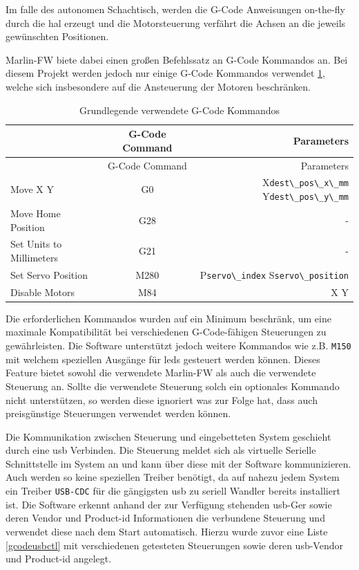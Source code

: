 Im falle des autonomen Schachtisch, werden die G-Code Anweisungen
on-the-fly durch die \gls{hal} erzeugt und die Motorsteuerung verfährt
die Achsen an die jeweils gewünschten Positionen.

Marlin-FW\cite{marlinfw} biete dabei einen großen Befehlssatz an
G-Code Kommandos an. Bei diesem Projekt werden jedoch nur einige G-Code
Kommandos verwendet \ref{gcodecmd}, welche sich insbesondere auf die
Ansteuerung der Motoren beschränken.

\begin{longtable}[]{@{}lcr@{}}
\caption{Grundlegende verwendete G-Code Kommandos
\label{gcodecmd}}\tabularnewline
\toprule
& G-Code Command & Parameters\tabularnewline
\midrule
\endfirsthead
\toprule
& G-Code Command & Parameters\tabularnewline
\midrule
\endhead
Move X Y & G0 & X\passthrough{\lstinline!dest\_pos\_x\_mm!}
Y\passthrough{\lstinline!dest\_pos\_y\_mm!}\tabularnewline
Move Home Position & G28 & -\tabularnewline
Set Units to Millimeters & G21 & -\tabularnewline
Set Servo Position & M280 & P\passthrough{\lstinline!servo\_index!}
S\passthrough{\lstinline!servo\_position!}\tabularnewline
Disable Motors & M84 & X Y\tabularnewline
\bottomrule
\end{longtable}

Die erforderlichen Kommandos wurden auf ein Minimum beschränk, um eine
maximale Kompatibilität bei verschiedenen G-Code-fähigen Steuerungen zu
gewährleisten. Die Software unterstützt jedoch weitere Kommandos wie
z.B. \passthrough{\lstinline!M150!} mit welchem speziellen Ausgänge für
\gls{led}s gesteuert werden können. Dieses Feature bietet sowohl die
verwendete Marlin-FW\cite{marlinfw} als auch die verwendete
Steuerung an. Sollte die verwendete Steuerung solch ein optionales
Kommando nicht unterstützen, so werden diese ignoriert was zur Folge
hat, dass auch preisgünstige Steuerungen verwendet werden können.

Die Kommunikation zwischen Steuerung und eingebetteten System geschieht
durch eine \gls{usb} Verbinden. Die Steuerung meldet sich als virtuelle
Serielle Schnittstelle im System an und kann über diese mit der Software
kommunizieren. Auch werden so keine speziellen Treiber benötigt, da auf
nahezu jedem System ein Treiber \passthrough{\lstinline!USB-CDC!} für
die gängigsten \gls{usb} zu seriell Wandler bereits installiert ist. Die
Software erkennt anhand der zur Verfügung stehenden \gls{usb}-Ger sowie
deren Vendor und Product-\gls{id} Informationen die verbundene Steuerung
und verwendet diese nach dem Start automatisch. Hierzu wurde zuvor eine
Liste \ref{gcodeusbctl} mit verschiedenen getesteten Steuerungen sowie
deren \gls{usb}-Vendor und Product-\gls{id} angelegt.

